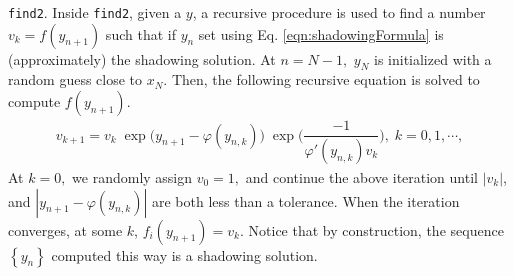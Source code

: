 \verb+find2+. Inside \verb+find2+, given a $y$, 
a recursive procedure is used to 
find a number $v_k = f(y_{n+1})$ such that if $y_n$ set 
using Eq. \ref{eqn:shadowingFormula} is (approximately) the shadowing 
solution. At $n = N-1,$ $y_N$ is initialized with a random guess close to $x_N.$
Then, the following recursive equation is solved to compute $f(y_{n+1})$.
\begin{align}
        v_{k+1} = v_k \;  \exp{\big({y_{n+1} - \varphi(y_{n,k})}\big)} \; \exp{\Big(\dfrac{-1}{\varphi'(y_{n,k}) v_k}\Big)}, \; k = 0,1,\cdots,
\end{align}
At $k=0,$ we randomly assign $v_0 = 1,$ and continue the above iteration 
until $|v_k|$, and $|y_{n+1} - \varphi(y_{n,k})|$ are both less than 
a tolerance. When the iteration converges, at some $k$,
$f_i(y_{n+1}) = v_k.$ Notice that by construction, the
sequence $\left\{ y_n\right\}$ computed this way is a shadowing solution.
